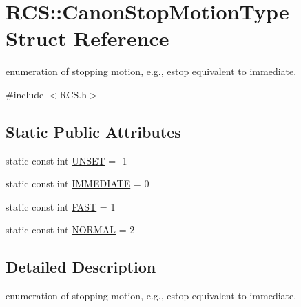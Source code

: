 \hypertarget{structRCS_1_1CanonStopMotionType}{\section{R\-C\-S\-:\-:Canon\-Stop\-Motion\-Type Struct Reference}
\label{structRCS_1_1CanonStopMotionType}
}


enumeration of stopping motion, e.\-g., estop equivalent to immediate.  




{\ttfamily \#include $<$R\-C\-S.\-h$>$}

\subsection*{Static Public Attributes}
\begin{DoxyCompactItemize}
\item 
static const int \hyperlink{structRCS_1_1CanonStopMotionType_ac195165fc047fc240c3b68db2491da1e}{U\-N\-S\-E\-T} = -\/1
\item 
static const int \hyperlink{structRCS_1_1CanonStopMotionType_aece9aa30f3fc2a0fe4c612fb2063b074}{I\-M\-M\-E\-D\-I\-A\-T\-E} = 0
\item 
static const int \hyperlink{structRCS_1_1CanonStopMotionType_a5f80c189b92160d7fd4a7f18d42e219e}{F\-A\-S\-T} = 1
\item 
static const int \hyperlink{structRCS_1_1CanonStopMotionType_a2b000079fed7d5f8f1cc88e5a5cba989}{N\-O\-R\-M\-A\-L} = 2
\end{DoxyCompactItemize}


\subsection{Detailed Description}
enumeration of stopping motion, e.\-g., estop equivalent to immediate. 

